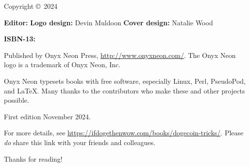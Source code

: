 \thispagestyle{empty}

\huge{\booktitle}
\newline
\large{\booksubtitle}
\newline
\newline
\normalsize

Copyright \copyright~2024 \bookauthor

\vfill
\textbf{Editor:} \bookauthor\newline
\textbf{Logo design:} Devin Muldoon\newline
\textbf{Cover design:} Natalie Wood

\textbf{ISBN-13:} \bookisbnthirteen

Published by Onyx Neon Press, \url{http://www.onyxneon.com/}.
The Onyx Neon logo is a trademark of Onyx Neon, Inc.

Onyx Neon typesets books with free software, especially Linux, Perl, PseudoPod,
and \LaTeX. Many thanks to the contributors who make these and other projects
possible.

First edition November 2024.

For more details, see \url{https://ifdogethenwow.com/books/dogecoin-tricks/}.
Please \emph{do} share this link with your friends and colleagues.

Thanks for reading!
